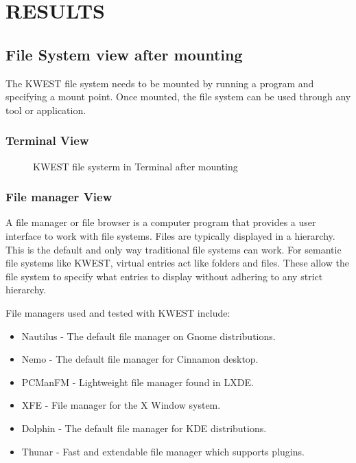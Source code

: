 \chapter {RESULTS}

\section{File System view after mounting}
The KWEST file system needs to be mounted by running a program and specifying a mount point. Once mounted, the file system can be used through any tool or application.
\subsection{Terminal View}
\begin{figure}[htb]
\centering
\setlength\fboxsep{0pt}
\setlength\fboxrule{0.5pt}
\caption{KWEST file systerm in Terminal after mounting}
\label{fig:dfd0}
\end{figure}

\subsection{File manager View}
A file manager or file browser is a computer program that provides a user interface to work with file systems. Files are typically displayed in a hierarchy. This is the default and only way traditional file systems can work. For semantic file systems like KWEST, virtual entries act like folders and files. These allow the file system to specify what entries to display without adhering to any strict hierarchy.

File managers used and tested with KWEST include: 
\begin{itemize}
\item Nautilus - The default file manager on Gnome distributions.
\item Nemo - The default file manager for Cinnamon desktop.
\item PCManFM - Lightweight file manager found in LXDE.
\item XFE - File manager for the X Window system.
\item Dolphin - The default file manager for KDE distributions.
\item Thunar - Fast and extendable file manager which supports plugins.
\end{itemize}


